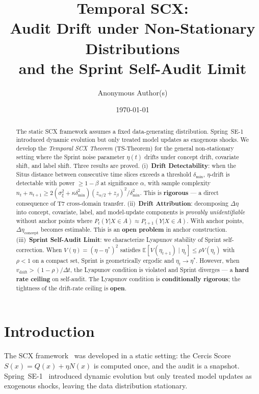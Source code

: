 \documentclass[12pt,a4paper]{article}
\title{\bfseries Temporal SCX:\\
Audit Drift under Non-Stationary Distributions\\
and the Sprint Self-Audit Limit}
\author{Anonymous Author(s)}
\date{\today}
\newcommand{\E}{\mathbb{E}}
\begin{document}
\maketitle

\begin{abstract}
The static SCX framework assumes a fixed data-generating distribution.
Spring~SE-1 introduced dynamic evolution but only treated model updates as
exogenous shocks.  We develop the \emph{Temporal SCX Theorem} (TS-Theorem)
for the general non-stationary setting where the Sprint noise parameter
$\eta(t)$ drifts under concept drift, covariate shift, and label shift.
Three results are proved.  (i)~\textbf{Drift Detectability}: when the Situs
distance between consecutive time slices exceeds a threshold $\delta_{\min}$,
$\eta$-drift is detectable with power $\geq 1-\beta$ at significance
$\alpha$, with sample complexity
$n_t + n_{t+1} \geq 2(\sigma^2_\xi + \kappa\delta^2_{\min})
(z_{\alpha/2} + z_\beta)^2 / \delta^2_{\min}$.  This is \textbf{rigorous}
--- a direct consequence of T7 cross-domain transfer.  (ii)~\textbf{Drift
Attribution}: decomposing $\Delta\eta$ into concept, covariate, label, and
model-update components is \emph{provably unidentifiable} without anchor
points where $P_t(Y|X \in A) \approx P_{t+1}(Y|X \in A)$.  With anchor
points, $\Delta\eta_{\mathrm{concept}}$ becomes estimable.  This is an
\textbf{open problem} in anchor construction.  (iii)~\textbf{Sprint
Self-Audit Limit}: we characterize Lyapunov stability of Sprint
self-correction.  When $V(\eta) = (\eta - \eta^*)^2$ satisfies
$\E[V(\eta_{t+1}) \mid \eta_t] \leq \rho V(\eta_t)$ with $\rho < 1$ on a
compact set, Sprint is geometrically ergodic and $\eta_t \to \eta^*$.
However, when $v_{\mathrm{drift}} > (1-\rho)/\Delta t$, the Lyapunov
condition is violated and Sprint diverges --- a \textbf{hard rate ceiling}
on self-audit.  The Lyapunov condition is \textbf{conditionally rigorous};
the tightness of the drift-rate ceiling is \textbf{open}.
\end{abstract}

\section{Introduction}

The SCX framework~\citep{scx2024cercis} was developed in a static setting:
the Cercis Score $S(x) = Q(x) + \eta N(x)$ is computed once, and the audit
is a snapshot.  Spring~SE-1~\citep{scx2024spring} introduced dynamic
evolution but only treated model updates as exogenous shocks, leaving the
data distribution stationary.
\end{document}
